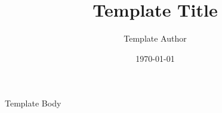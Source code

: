 \documentclass{article}
\title{Template Title}
\author{Template Author}
\date{\today}
\begin{document}
\maketitle

Template Body
\end{document}
